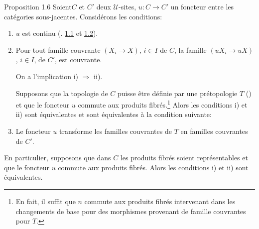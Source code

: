 \begin{enonce*}{Proposition 1.6}
Soient\pageoriginale $C$ et $C'$ deux $𝒰$-sites,
$u:C\rightarrow C'$ un foncteur entre les catégories
sous-jacentes. Considérons les conditions:
\begin{enumerate}
\renewcommand{\theenumi}{\roman{enumi}}
\renewcommand{\labelenumi}{\theenumi)}
\item $u$ est continu {\rm(\cf. \hyperref[III.def1.1]{1.1} et \hyperref[III.prop1.2]{1.2}).}

\item Pour tout famille couvrante $(X_i\rightarrow X)$, $i\in I$ de
  $C$, la famille $(uX_i\rightarrow uX)$, $i\in I$, de $C'$, est
  couvrante.

On a l'implication {\rm i) $\Rightarrow$ ii).}

Supposons que la topologie de $C$ puisse être définie par une
prétopologie {\rm $T$ ()} et que le foncteur $u$
commute aux produits fibrés.\footnote[1]{En fait, il suffit que $n$
commute aux
  produits fibrés intervenant dans les changements de base pour des
  morphismes provenant de famille couvrantes pour $T$.} Alors les
conditions {\rm i)} et {\rm ii)} sont équivalentes et sont
équivalentes à la condition suivante:

\item Le foncteur $u$ transforme les familles couvrantes de $T$ en
  familles couvrantes de $C'$.
\end{enumerate}

En particulier, supposons que dans $C$ les produits fibrés
soient représentables et que le foncteur $u$ commute aux
produits fibrés. Alors les conditions {\rm i)} et {\rm ii)} sont
équivalentes.
\end{enonce*}

